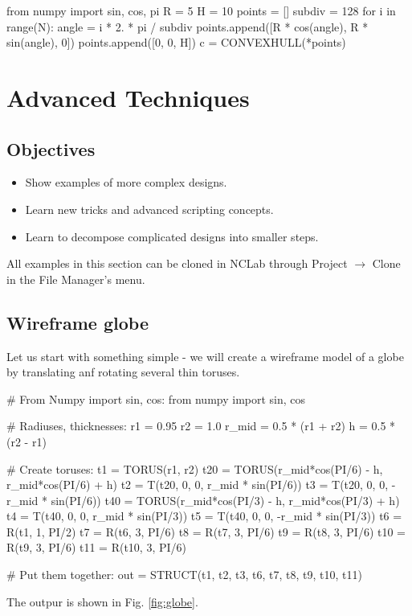 \begin{bluecode}
from numpy import sin, cos, pi
R = 5
H = 10
points = []
subdiv = 128
for i in range(N):
    angle = i * 2. * pi / subdiv
    points.append([R * cos(angle), R * sin(angle), 0])
points.append([0, 0, H])
c = CONVEXHULL(*points)
\end{bluecode}
\noindent




\section{Advanced Techniques}

\subsection{Objectives}
\begin{itemize}
\item Show examples of more complex designs.
\item Learn new tricks and advanced scripting concepts.
\item Learn to decompose complicated designs into smaller steps.
\end{itemize}
All examples in this section can be cloned in NCLab through 
Project $\rightarrow$ Clone in the File Manager's menu.

\subsection{Wireframe globe}

Let us start with something simple - we will create a wireframe model 
of a globe by translating anf rotating several thin toruses.

\begin{bluecode}
# From Numpy import sin, cos:
from numpy import sin, cos

# Radiuses, thicknesses:
r1 = 0.95
r2 = 1.0
r_mid = 0.5 * (r1 + r2)
h = 0.5 * (r2 - r1)

# Create toruses:
t1 = TORUS(r1, r2)
t20 = TORUS(r_mid*cos(PI/6) - h, r_mid*cos(PI/6) + h)
t2 = T(t20, 0, 0, r_mid * sin(PI/6))
t3 = T(t20, 0, 0, -r_mid * sin(PI/6))
t40 = TORUS(r_mid*cos(PI/3) - h, r_mid*cos(PI/3) + h)
t4 = T(t40, 0, 0, r_mid * sin(PI/3))
t5 = T(t40, 0, 0, -r_mid * sin(PI/3))
t6 = R(t1, 1, PI/2)
t7 = R(t6, 3, PI/6)
t8 = R(t7, 3, PI/6)
t9 = R(t8, 3, PI/6)
t10 = R(t9, 3, PI/6)
t11 = R(t10, 3, PI/6)

# Put them together:
out = STRUCT(t1, t2, t3, t6, t7, t8, t9, t10, t11)
\end{bluecode}
The outpur is shown in Fig. \ref{fig:globe}.\\


